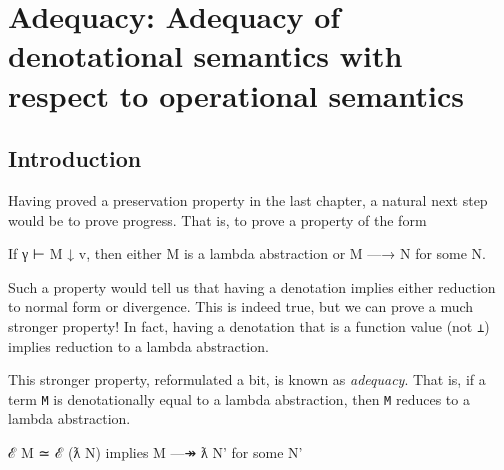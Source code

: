 \hypertarget{Adequacy}{%
\chapter{Adequacy: Adequacy of denotational semantics with respect to
operational semantics}\label{Adequacy}}

\begin{fence}
\begin{code}%
\>[0]\AgdaSpace{}%
\AgdaSpace{}%
\<%
\end{code}
\end{fence}

\hypertarget{introduction}{%
\section{Introduction}\label{introduction}}

Having proved a preservation property in the last chapter, a natural
next step would be to prove progress. That is, to prove a property of
the form

\begin{myDisplay}
If γ ⊢ M ↓ v, then either M is a lambda abstraction or M —→ N for some N.
\end{myDisplay}

Such a property would tell us that having a denotation implies either
reduction to normal form or divergence. This is indeed true, but we can
prove a much stronger property! In fact, having a denotation that is a
function value (not \texttt{⊥}) implies reduction to a lambda
abstraction.

This stronger property, reformulated a bit, is known as \emph{adequacy}.
That is, if a term \texttt{M} is denotationally equal to a lambda
abstraction, then \texttt{M} reduces to a lambda abstraction.

\begin{myDisplay}
ℰ M ≃ ℰ (ƛ N)  implies M —↠ ƛ N' for some N'
\end{myDisplay}

